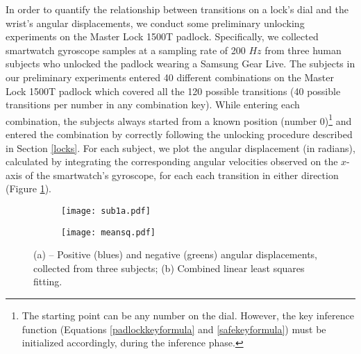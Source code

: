 \documentclass[]{IEEEtran}
\begin{document}
In order to quantify the relationship between transitions on a lock's dial and the wrist's angular displacements, we conduct some preliminary unlocking experiments on the Master Lock 1500T padlock. Specifically, we collected smartwatch gyroscope samples at a sampling rate of 200 $Hz$ from three human subjects who unlocked the padlock wearing a Samsung Gear Live.
The subjects in our preliminary experiments entered 40 different combinations on the Master Lock 1500T padlock which covered all the 120 possible transitions (40 possible transitions per number in any combination key). While entering each combination, the subjects always started from a known position (number 0)\footnote{The starting point can be any number on the dial. However, the key inference function (Equations \ref{padlockkeyformula} and \ref{safekeyformula}) must be initialized accordingly, during the inference phase.} and entered the combination by correctly following the unlocking procedure described in Section \ref{locks}. For each subject, we plot the angular displacement (in radians), calculated by integrating the corresponding angular velocities observed on the $x$-axis of the smartwatch's gyroscope, for each each transition in either direction (Figure \ref{sub1a}).

\begin{figure}[b]
\centering
\begin{subfigure}[t]{0.49\linewidth}
\texttt{[image: sub1a.pdf]}
\caption{}
\label{sub1a}
\end{subfigure}
\begin{subfigure}[t]{0.49\linewidth}
\texttt{[image: meansq.pdf]}
\caption{}
\label{leastmeansq}
\end{subfigure}
\caption{(a) -- Positive (blues) and negative (greens) angular displacements, collected from three subjects; (b) Combined linear least squares fitting.}
\label{rotationgraph}
\end{figure}
\end{document}
